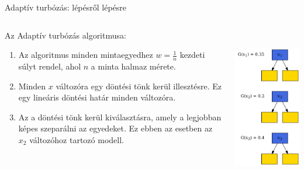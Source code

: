\documentclass[english, aspectratio=169]{beamer}
\begin{document}
\begin{frame}{Adaptív turbózás: lépésről lépésre}
\begin{columns}
\begin{column}{.5\textwidth}
Az Adaptív turbózás algoritmusa:
\begin{enumerate}
	\item Az algoritmus minden mintaegyedhez $w=\frac{1}{n}$ kezdeti súlyt rendel, ahol $n$ a minta halmaz mérete.
	\item Minden $x$ változóra egy döntési tönk kerül illesztésre. Ez egy lineáris döntési határ minden változóra. 
	\item Az a döntési tönk kerül kiválasztásra, amely a legjobban képes szeparálni az egyedeket. Ez ebben az esetben az $x_2$ változóhoz tartozó modell. 
\end{enumerate}
\end{column}
\begin{column}{.5\textwidth}
\begin{center}
\includegraphics[width=7cm, height=7cm, keepaspectratio]{graphs/ensemble_1.png}
\end{center}
\end{column}
\end{columns}
\end{frame}
\end{document}
